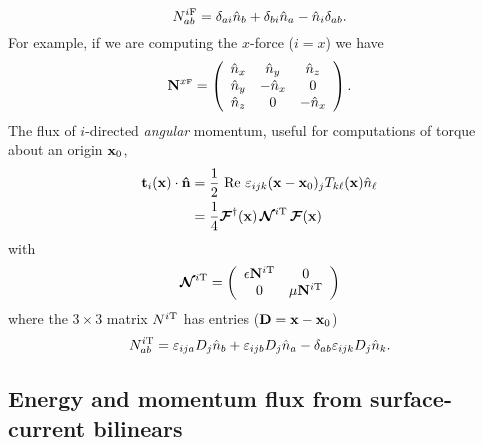 \documentclass[letterpaper]{article}
\newcommand{\IF}{^{i\text{\scriptsize F}}}
\newcommand{\IT}{^{i\text{\scriptsize T}}}
\begin{document}
$$ N\IF_{ab} = 
   \delta_{ai} \hat{n}_b + \delta_{bi} \hat{n}_a
  - \hat{n}_i \delta_{ab}.
$$
For example, if we are computing the $x$-force ($i=x$)
we have 
$$ \mathbf{N}^{x\text{\tiny F}}=\left(\begin{array}{ccc}
   \hat{n}_x & \hat n_y   & \hat n_z \\
   \hat{n}_y & -\hat{n}_x & 0 \\
   \hat{n}_z & 0          & -\hat{n}_x
  \end{array}\right).
$$
The flux of $i$-directed \textit{angular} momentum, useful
for computations of torque about an origin $\mathbf{x}_0$,
\begin{align}
 \vb t_{i}(\vb x) \cdot \vbhat{n}
&=\frac{1}{2}
  \text{ Re }
  \varepsilon_{ijk}(\vb x-\vb x_0)_j T_{k\ell}(\vb x) \hat{n}_\ell
\\
&= \frac{1}{4}\bmc{F}^\dagger(\vb x) 
   \, \bmc{N}\IT \, \bmc{F}(\vb x)
\label{ITVMVP}
\end{align}
with 
$$
   \bmc N\IT=
   \left(\begin{array}{cc}
   \epsilon \vb N\IT & 0 \\
            0        & \mu \vb N\IT 
   \end{array}\right)
$$
where the $3\times 3$ matrix $N\IT$ has entries ($\mathbf{D}=\mathbf{x}-\mathbf{x}_0$)
$$ N\IT_{ab}=
   \varepsilon_{ija}D_j \hat{n}_b
  +\varepsilon_{ijb}D_j \hat{n}_a
  -\delta_{ab} \varepsilon_{ijk} D_j \hat{n}_k.
$$

\subsection*{Energy and momentum flux from surface-current bilinears}
\end{document}
